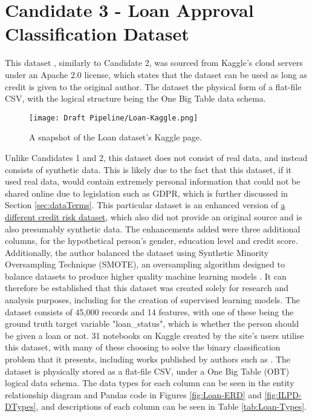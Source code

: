\section{Candidate 3 - Loan Approval Classification Dataset}\label{sec:Dataset}
This dataset \autocite{lo_loan_nodate}, similarly to Candidate 2, was sourced from Kaggle's cloud servers under 
an Apache 2.0 license, which states that the dataset can be used as long as credit is given to the original author.
The dataset the physical form of a flat-file CSV, with the logical structure being the One Big Table data 
schema. 

\begin{figure}[H]
    \centering
    \texttt{[image: Draft Pipeline/Loan-Kaggle.png]}
    \caption{A snapshot of the Loan dataset's Kaggle page.}
    \label{fig:Loan-Kaggle}
\end{figure}

Unlike Candidates 1 and 2, this dataset does not consist of real data, and 
instead consists of synthetic data. This is likely due to the fact that this dataset, if it used real data, would contain extremely personal 
information that could not be shared online due to legislation such as GDPR, which is further discussed in Section \ref{sec:dataTerms}. This particular dataset is an enhanced version of \href{https://www.kaggle.com/datasets/laotse/credit-risk-dataset}{a different credit risk dataset},
which also did not provide an original source and is also presumably synthetic data. The enhancements added were three additional 
columns, for the hypothetical person's gender, education level and credit score. Additionally, the author balanced the dataset using 
Synthetic Minority Oversampling Technique (SMOTE), an oversampling algorithm designed to balance datasets to produce higher
quality machine learning models \autocite{microsoft_smote_2024}.
It can therefore be established that this dataset was created solely for research and analysis purposes, including 
for the creation of supervised learning models. The dataset consists of 45,000 records and 14 features, with 
one of these being the ground truth target variable "loan\_status", which is whether the person should be given a loan or not. 
31 notebooks on Kaggle created by the site's users utilise this dataset, with many of these choosing to solve the binary classification 
problem that it presents, including works published by authors such as \autocite{gupta_loanification_2021}. 
The dataset is physically stored as a flat-file CSV, under a One Big Table (OBT) logical data schema.
The data types for each column can be seen in the entity relationship diagram and Pandas code in Figures \ref{fig:Loan-ERD} and \ref{fig:ILPD-DTypes}, and 
descriptions of each column can be seen in Table \ref{tab:Loan-Types}.

